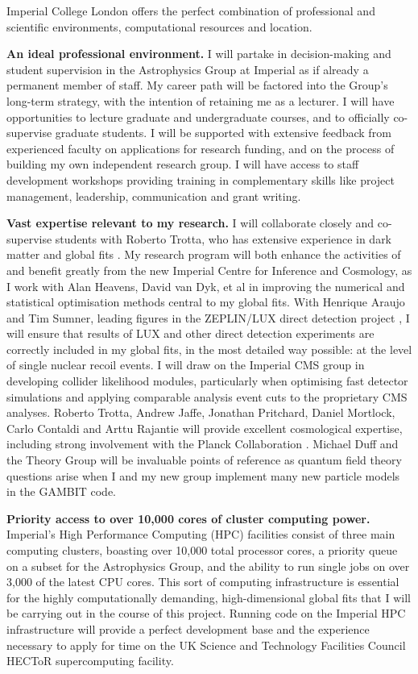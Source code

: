 \documentclass[a4paper,11pt]{article}
\begin{document}
Imperial College London offers the perfect combination of professional and scientific environments, computational resources and location.

\textbf{An ideal professional environment.} I will partake in decision-making and student supervision in the Astrophysics Group at Imperial as if already a permanent member of staff.  My career path will be factored into the Group's long-term strategy, with the intention of retaining me as a lecturer.  I will have opportunities to lecture graduate and undergraduate courses, and to officially co-supervise graduate students.  I will be supported with extensive feedback from experienced faculty on applications for research funding, and on the process of building my own independent research group.  I will have access to staff development workshops providing training in complementary skills like project management, leadership, communication and grant writing.

\textbf{Vast expertise relevant to my research.} 
I will collaborate closely and co-supervise students with Roberto Trotta, who has extensive experience in dark matter and global fits \cite{Trotta08, SuperbayesXENON100, BertoneLHCDD, Strege12, Strege13}. My research program will both enhance the activities of and benefit greatly from the new Imperial Centre for Inference and Cosmology, as I work with Alan Heavens, David van Dyk, et al in improving the numerical and statistical optimisation methods central to my global fits.  With Henrique Araujo and Tim Sumner, leading figures in the ZEPLIN/LUX direct detection project \cite{ZEPLINIII}, I will ensure that results of LUX and other direct detection experiments are correctly included in my global fits, in the most detailed way possible: at the level of single nuclear recoil events. I will draw on the Imperial CMS group in developing collider likelihood modules, particularly when optimising fast detector simulations and applying comparable analysis event cuts to the proprietary CMS analyses.  Roberto Trotta, Andrew Jaffe, Jonathan Pritchard, Daniel Mortlock, Carlo Contaldi and Arttu Rajantie will provide excellent cosmological expertise, including strong involvement with the Planck Collaboration \cite{PlanckCosmology}.  Michael Duff and the Theory Group will be invaluable points of reference as quantum field theory questions arise when I and my new group implement many new particle models in the GAMBIT code.

\textbf{Priority access to over 10,000 cores of cluster computing power.}
Imperial's High Performance Computing (HPC) facilities consist of three main computing clusters, boasting over 10,000 total processor cores, a priority queue on a subset for the Astrophysics Group, and the ability to run single jobs on over 3,000 of the latest CPU cores.  This sort of computing infrastructure is essential for the highly computationally demanding, high-dimensional global fits that I will be carrying out in the course of this project.  Running code on the Imperial HPC infrastructure will provide a perfect development base and the experience necessary to apply for time on the UK Science and Technology Facilities Council HECToR supercomputing facility.
\end{document}
